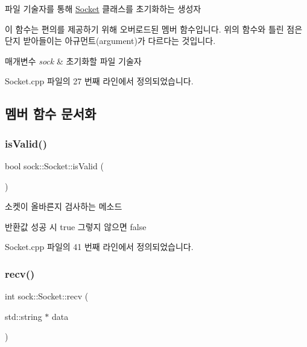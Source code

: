 파일 기술자를 통해 \hyperlink{classsock_1_1_socket}{Socket} 클래스를 초기화하는 생성자 

이 함수는 편의를 제공하기 위해 오버로드된 멤버 함수입니다. 위의 함수와 틀린 점은 단지 받아들이는 아규먼트(argument)가 다르다는 것입니다. 
\begin{DoxyParams}{매개변수}
{\em sock} & 초기화할 파일 기술자 \\
\hline
\end{DoxyParams}


Socket.\+cpp 파일의 27 번째 라인에서 정의되었습니다.



\subsection{멤버 함수 문서화}
\mbox{\label{classsock_1_1_socket_a448363328243c35f7899761381cac1df}} 
\subsubsection{\texorpdfstring{is\+Valid()}{isValid()}}
{\footnotesize\ttfamily bool sock\+::\+Socket\+::is\+Valid (\begin{DoxyParamCaption}{ }\end{DoxyParamCaption})}



소켓이 올바른지 검사하는 메소드 

\begin{DoxyReturn}{반환값}
성공 시 true 그렇지 않으면 false 
\end{DoxyReturn}


Socket.\+cpp 파일의 41 번째 라인에서 정의되었습니다.

\mbox{\label{classsock_1_1_socket_aa52c41c177bd1f7fe785d32d46f60b9f}} 
\subsubsection{\texorpdfstring{recv()}{recv()}}
{\footnotesize\ttfamily int sock\+::\+Socket\+::recv (\begin{DoxyParamCaption}\item[{std\+::string $\ast$}]{data }\end{DoxyParamCaption})}



